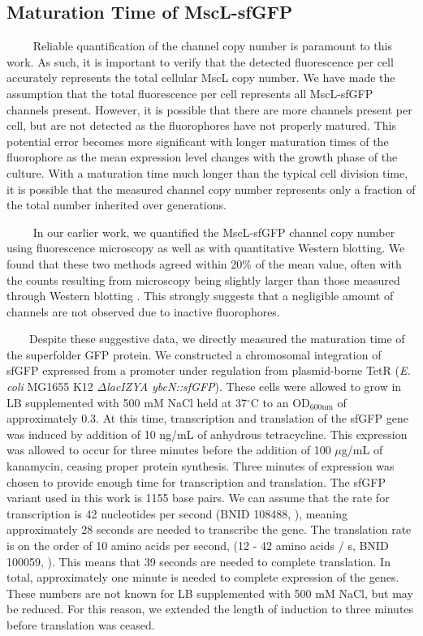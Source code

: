 \documentclass[12pt]{caltech_thesis}
\begin{document}
\hypertarget{maturation-time-of-mscl-sfgfp}{%
\subsection{Maturation Time of
MscL-sfGFP}\label{maturation-time-of-mscl-sfgfp}}

~~~~ Reliable quantification of the channel copy number is paramount to
this work. As such, it is important to verify that the detected
fluorescence per cell accurately represents the total cellular MscL copy
number. We have made the assumption that the total fluorescence per cell
represents all MscL-sfGFP channels present. However, it is possible that
there are more channels present per cell, but are not detected as the
fluorophores have not properly matured. This potential error becomes
more significant with longer maturation times of the fluorophore as the
mean expression level changes with the growth phase of the culture. With
a maturation time much longer than the typical cell division time, it is
possible that the measured channel copy number represents only a
fraction of the total number inherited over generations.

~~~~ In our earlier work, we quantified the MscL-sfGFP channel copy
number using fluorescence microscopy as well as with quantitative
Western blotting. We found that these two methods agreed within 20\% of
the mean value, often with the counts resulting from microscopy being
slightly larger than those measured through Western blotting
\autocite{bialecka-fornal2012}. This strongly suggests that a negligible
amount of channels are not observed due to inactive fluorophores.

~~~~Despite these suggestive data, we directly measured the maturation
time of the superfolder GFP protein. We constructed a chromosomal
integration of sfGFP expressed from a promoter under regulation from
plasmid-borne TetR (\emph{E. coli} MG1655 K12 \emph{\(\Delta\)lacIZYA
ybcN::sfGFP}). These cells were allowed to grow in LB supplemented with
500 mM NaCl held at 37\(^\circ\)C to an OD\(_{600\text{nm}}\) of
approximately 0.3. At this time, transcription and translation of the
sfGFP gene was induced by addition of 10 ng/mL of anhydrous
tetracycline. This expression was allowed to occur for three minutes
before the addition of 100 \(\mu\)g/mL of kanamycin, ceasing proper
protein synthesis. Three minutes of expression was chosen to provide
enough time for transcription and translation. The sfGFP variant used in
this work is 1155 base pairs. We can assume that the rate for
transcription is 42 nucleotides per second (BNID 108488,
\textcite{milo2010}), meaning approximately 28 seconds are needed to
transcribe the gene. The translation rate is on the order of 10 amino
acids per second, (12 - 42 amino acids / s, BNID 100059,
\textcite{milo2010}). This means that 39 seconds are needed to complete
translation. In total, approximately one minute is needed to complete
expression of the genes. These numbers are not known for LB supplemented
with 500 mM NaCl, but may be reduced. For this reason, we extended the
length of induction to three minutes before translation was ceased.
\end{document}
